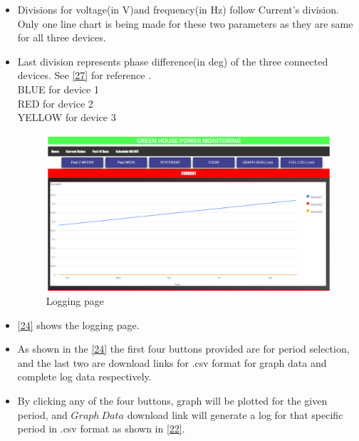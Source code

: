 \documentclass[a4paper,12pt,oneside]{book}
\begin{document}
\begin{itemize}
	\item{Divisions for voltage(in V)and frequency(in Hz) follow Current's division.	
		\\ Only one line chart is being made for these two parameters as they are same for all three devices.}
	
	\item{Last division represents phase difference(in deg) of the three connected devices. See  \autoref{27} for reference .\\BLUE for device 1\\RED for device 2\\YELLOW for device 3 } 
	
	\begin{figure}[H]
		\centering
		\includegraphics[width=15cm]{logging_page.png}
		\caption{Logging page}
		\label{24}
	\end{figure}
	
	
	\item{\autoref{24} shows the logging page.}
	\item{As shown in the \autoref{24} the first four buttons provided are for period selection, and the last two are download links for .csv format for graph data and complete log data respectively.   }
	
	\item{By clicking any of the four buttons, graph will be plotted for the given period, and $Graph\ Data$ download link will generate a log for that specific period in .csv format as shown in \autoref{22}.}
	

\end{itemize}
\end{document}
